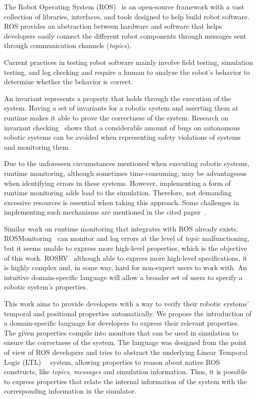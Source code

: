 \documentclass[runningheads]{llncs}
\begin{document}
The Robot Operating System (ROS)~\cite{quigley2009ros} is an open-source framework with a vast collection of libraries, interfaces, and tools designed to help build robot software. ROS provides an abstraction between hardware and software that helps developers easily connect the different robot components through messages sent through communication channels (\textit{topics}).

Current practices in testing robot software mainly involve field testing, simulation testing, and log checking and require a human to analyze the robot's behavior to determine whether the behavior is correct.

An invariant represents a property that holds through the execution of the system. Having a set of invariants for a robotic system and asserting them at runtime makes it able to prove the correctness of the system. Research on invariant checking~\cite{zizyte2021importance} shows that a considerable amount of bugs on autonomous robotic systems can be avoided when representing safety violations of systems and monitoring them.

Due to the unforeseen circumstances mentioned when executing robotic systems, runtime monitoring, although sometimes time-consuming, may be advantageous when identifying errors in these systems. However, implementing a form of runtime monitoring adds load to the simulation. Therefore, not demanding excessive resources is essential when taking this approach. Some challenges in implementing such mechanisms are mentioned in the cited paper~\cite{stadler2022towards}.

Similar work on runtime monitoring that integrates with ROS already exists. ROSMonitoring~\cite{ferrando2020rosmonitoring} can monitor and log errors at the level of \textit{topic} malfunctioning, but it seems unable to express more high-level properties, which is the objective of this work. ROSRV~\cite{huang2014rosrv} although able to express more high-level specifications, it is highly complex and, in some way, hard for non-expert users to work with. An intuitive domain-specific language will allow a broader set of users to specify a robotic system's properties.

This work aims to provide developers with a way to verify their robotic systems' temporal and positional properties automatically. We propose the introduction of a domain-specific language for developers to express their relevant properties. The given properties compile into monitors that can be used in simulation to ensure the correctness of the system. The language was designed from the point of view of ROS developers and tries to abstract the underlying Linear Temporal Logic (LTL)~\cite{pnueli1977temporal}~\cite{dwyer1998property} system, allowing properties to reason about native ROS constructs, like \textit{topics}, \textit{messages} and simulation information. Thus, it is possible to express properties that relate the internal information of the system with the corresponding information in the simulator.
\end{document}
